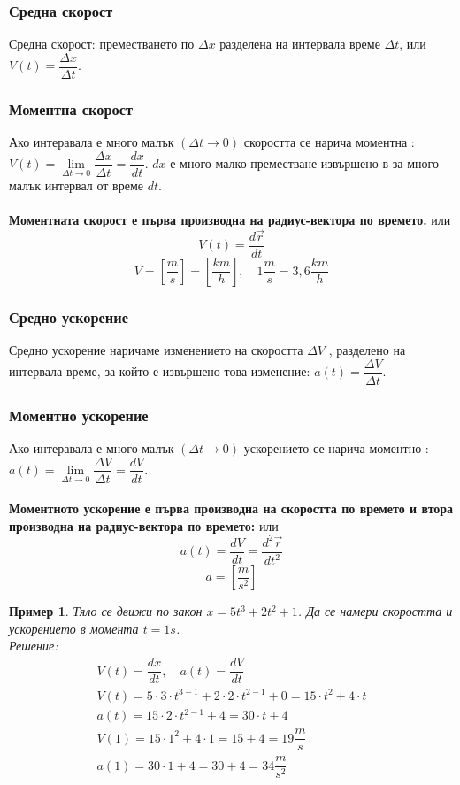 \documentclass[fleqn, 12pt]{article}
\newtheorem{example}{Пример}[subsection]
\begin{document}
\subsubsection{Средна скорост}
Средна скорост: преместването по $\Delta x$ разделена на интервала време $\Delta t$, или $V(t) = \dfrac{\Delta x}{\Delta t}$.

\subsubsection{Моментна скорост}
Ако интеравала е много малък $(\Delta t \rightarrow 0)$ скоростта се нарича моментна : $V(t) = \lim\limits_{\Delta t \rightarrow 0}\dfrac{\Delta x}{\Delta t} = \dfrac{dx}{dt}$. $dx$ е много малко преместване извършено в за много малък интервал от време $dt$.\\
\\
\textbf{Моментната скорост е първа производна на радиус-вектора по времето.} или 
$$V(t) = \dfrac{d \vec{r}}{dt}$$
$$V = \left[ \dfrac{m}{s}\right] = \left[ \dfrac{km}{h}\right], \quad 1\dfrac{m}{s} = 3,6 \dfrac{km}{h} $$

\subsubsection{Средно ускорение}
Средно ускорение наричаме изменението на скоростта $\Delta V$ , разделено на интервала време, за който е извършено това изменение: $a(t) =\dfrac{\Delta V}{\Delta t}$.

\subsubsection{Моментно ускорение}
Ако интеравала е много малък $(\Delta t \rightarrow 0)$ ускорението се нарича моментно : $a(t) = \lim\limits_{\Delta t \rightarrow 0}\dfrac{\Delta V}{\Delta t} = \dfrac{dV}{dt}$.\\
\\
\textbf{Моментното ускорение е първа производна на скоростта по времето и втора производна на радиус-вектора по времето: } или 
$$a(t) =  \dfrac{dV}{dt} = \dfrac{d^2 \vec{r}}{dt^2}$$
$$a = \left[ \dfrac{m}{s^2} \right]$$

\begin{example}
Тяло се движи по закон $x = 5t^3 + 2t^2 + 1$. Да се намери скоростта и ускорението в момента $t = 1s$. \\
Решение: \\
\begin{gather*}
V(t) = \dfrac{dx}{dt}, \quad a(t) = \dfrac{dV}{dt} \\
V(t) = 5 \cdot 3 \cdot t^{3-1} + 2 \cdot 2 \cdot t^{2-1} + 0 = 15 \cdot t^2 + 4\cdot t \\
a(t) = 15\cdot 2 \cdot t^{2-1} + 4 = 30 \cdot t + 4 \\
V(1) = 15 \cdot 1^2 + 4 \cdot 1 = 15 + 4 = 19 \dfrac{m}{s} \\
a(1) = 30 \cdot 1 + 4 = 30 + 4 = 34 \dfrac{m}{s^2}
\end{gather*}
\end{example}
\end{document}
